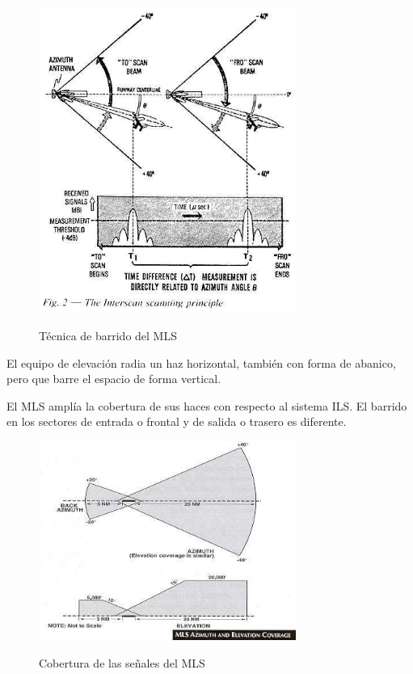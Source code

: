 \begin{figure}[!htb]
  \centering
  {\includegraphics[width = 0.75\textwidth]{06.radionavegacion/Imagenes/06.Sistemas.Aproximacion/06_MLS_007.png} }
  \caption{Técnica de barrido del MLS}
  \label{fig:06.MLS.tecnica.barrido}
\end{figure}



El equipo de elevación radia un haz horizontal, también con forma de abanico, pero que barre el
espacio de forma vertical.

El MLS amplía la cobertura de sus haces con respecto al sistema ILS. El barrido en los sectores
de entrada o frontal y de salida o trasero es diferente.

\begin{figure}[!htb]
  \centering
  {\includegraphics[width = 0.75\textwidth]{06.radionavegacion/Imagenes/06.Sistemas.Aproximacion/06_MLS_008.png} }
  \caption{Cobertura de las señales del MLS}
  \label{fig:06.MLS.cobertura.seniales}
\end{figure}

